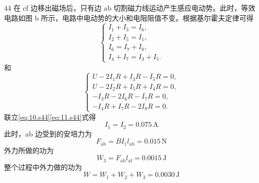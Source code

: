 \begin{solution}{44}
    在 cf 边移出磁场后，只有边 ab 切割磁力线运动产生感应电动势。此时，等效电路如图 b 所示，电路中电动势的大小和电阻阻值不变。根据基尔霍夫定律可得
    \begin{equation}
        \begin{cases}
            I_{1} + I_{3} = I_{6}, \\
            I_{2} + I_{5} = I_{1}, \\
            I_{6} = I_{7} + I_{8}, \\
            I_{4} + I_{7} = I_{3} + I_{5}.
        \end{cases}
        \label{eq:10.s44}
    \end{equation}
    和
    \begin{equation}
        \begin{cases}
            U - 2I_{1}R + I_{3}R - I_{5}R = 0, \\
            U - 2I_{2}R + I_{5}R + I_{4}R = 0, \\
            -I_{3}R - 2I_{6}R - I_{7}R = 0, \\
            -I_{4}R + I_{7}R - 2I_{8}R = 0.
        \end{cases}
        \label{eq:11.s44}
    \end{equation}
    联立\eqref{eq:10.s44}\eqref{eq:11.s44}式得
    \begin{equation}
        I_{1} = I_{2} = 0.075\,\mathrm{A}
        \label{eq:12.s44}
    \end{equation}
    此时，ab 边受到的安培力为
    \begin{equation}
        F_{\mathrm{ab}} = B I_{1} l_{\mathrm{ab}} = 0.015\,\mathrm{N}
        \label{eq:13.s44}
    \end{equation}
    外力所做的功为
    \begin{equation}
        W_{3} = F_{\mathrm{ab}} l_{\mathrm{af}} = 0.0015\,\mathrm{J}
        \label{eq:14.s44}
    \end{equation}
    整个过程中外力做的功为
    \begin{equation}
        W = W_{1} + W_{2} + W_{3} = 0.0030\,\mathrm{J}
        \label{eq:15.s44}
    \end{equation}
\end{solution}